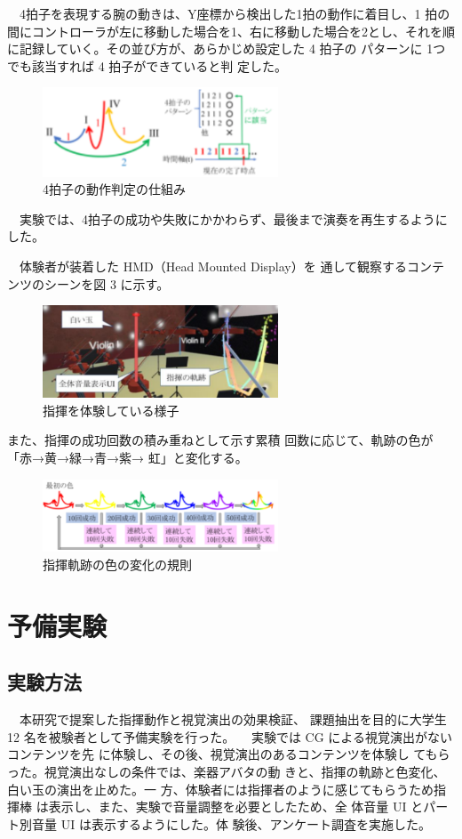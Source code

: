 \documentclass[uplatex]{jsarticle}   %
\begin{document}
　4拍子を表現する腕の動きは、Y座標から検出した1拍の動作に着目し、1 拍の間にコントローラが左に移動した場合を1、右に移動した場合を2とし、それを順に記録していく。その並び方が、あらかじめ設定した 4 拍子の パターンに 1つでも該当すれば 4 拍子ができていると判 定した。

 \begin{figure}[H]
 \centering
 \includegraphics[clip,width=7cm]{hyousi.png}
 \caption{4拍子の動作判定の仕組み}\label{fig:hoge}
\end{figure}
 
　実験では、4拍子の成功や失敗にかかわらず、最後まで演奏を再生するようにした。 

　体験者が装着した HMD（Head Mounted Display）を 通して観察するコンテンツのシーンを図 3 に示す。

 \begin{figure}[H]
 \centering
 \includegraphics[clip,width=7cm]{sikumi.png}
 \caption{指揮を体験している様子}\label{fig:hoge}
\end{figure}

また、指揮の成功回数の積み重ねとして示す累積 回数に応じて、軌跡の色が「赤→黄→緑→青→紫→ 虹」と変化する。

\begin{figure}[H]
 \centering
 \includegraphics[clip,width=7cm]{sikisikumi.png}
 \caption{指揮軌跡の色の変化の規則}\label{fig:hoge}
\end{figure}

\section{予備実験}
\subsection{実験方法}
　本研究で提案した指揮動作と視覚演出の効果検証、 課題抽出を目的に大学生 12 名を被験者として予備実験を行った。
　実験では CG による視覚演出がないコンテンツを先 に体験し、その後、視覚演出のあるコンテンツを体験し てもらった。視覚演出なしの条件では、楽器アバタの動 きと、指揮の軌跡と色変化、白い玉の演出を止めた。一 方、体験者には指揮者のように感じてもらうため指揮棒 は表示し、また、実験で音量調整を必要としたため、全 体音量 UI とパート別音量 UI は表示するようにした。体 験後、アンケート調査を実施した。
\end{document}
